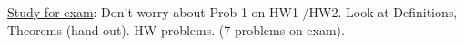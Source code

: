 \documentclass[]{article}
\begin{document}
\ul{Study for exam}: Don't worry about Prob 1 on HW1 /HW2. Look at Definitions, Theorems (hand out). HW problems. (7 problems on exam).

\newpage

\end{document}
